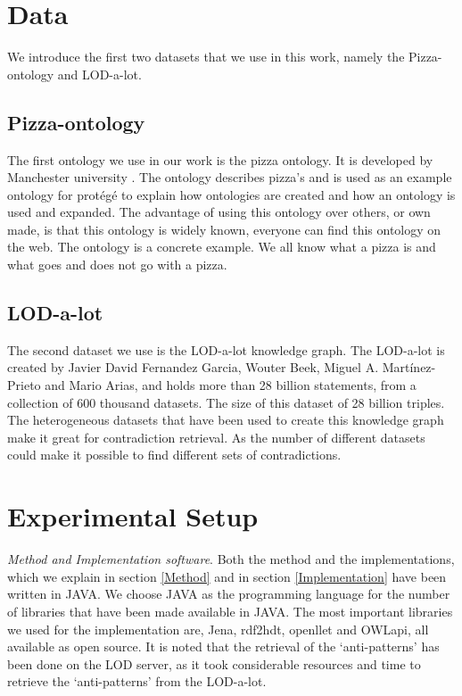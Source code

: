\documentclass[11pt,letterpaper ,oneside ]{book}
\begin{document}
	\section{Data}
	We introduce the first two datasets that we use in this work, namely the Pizza-ontology and LOD-a-lot.
	
	\subsection{Pizza-ontology}
	The first ontology we use in our work is the pizza ontology. It is developed by Manchester university \cite{pizza}. The ontology describes pizza's and is used as an example ontology for prot\'{e}g\'{e} to explain how ontologies are created and how an ontology is used and expanded. The advantage of using this ontology over others, or own made, is that this ontology is widely known, everyone can find this ontology on the web. The ontology is a concrete example. We all know what a pizza is and what goes and does not go with a pizza. \\
	
	\subsection{LOD-a-lot}
	The second dataset we use is the LOD-a-lot\cite{JavierD:2017} knowledge graph. The LOD-a-lot is created by Javier David Fernandez Garcia, Wouter Beek, Miguel A. Martínez-Prieto and Mario Arias, and holds more than 28 billion statements, from a collection of 600 thousand datasets. The size of this dataset of 28 billion triples. The heterogeneous datasets that have been used to create this knowledge graph make it great for contradiction retrieval. As the number of different datasets could make it possible to find different sets of contradictions.
	
	\section{Experimental Setup}
	\textit{Method and Implementation software}. Both the method and the implementations, which we explain in section \ref{Method} and in section \ref{Implementation} have been written in JAVA. We choose JAVA as the programming language for the number of libraries that have been made available in JAVA. The most important libraries we used for the implementation are, Jena, rdf2hdt, openllet and OWLapi, all available as open source. It is noted that the retrieval of the `anti-patterns' has been done on the LOD server, as it took considerable resources and time to retrieve the `anti-patterns' from the LOD-a-lot. 
	
\end{document}
